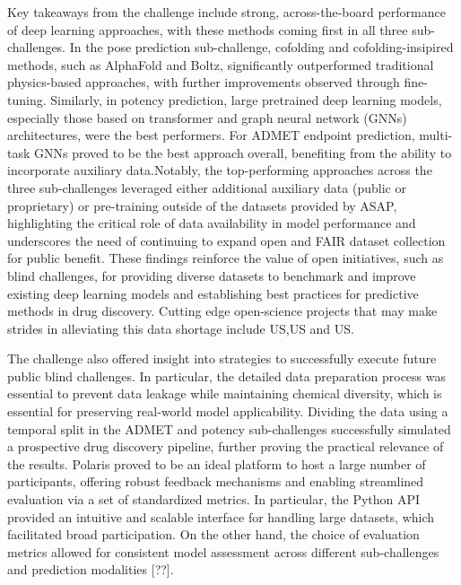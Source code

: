 \documentclass[journal=jcim,manuscript=article]{achemso}
\begin{document}
Key takeaways from the challenge include strong, across-the-board performance of deep learning approaches, with these methods coming first in all three sub-challenges. In the pose prediction sub-challenge, cofolding and cofolding-insipired methods, such as AlphaFold and Boltz, significantly outperformed traditional physics-based approaches, with further improvements observed through fine-tuning. Similarly, in potency prediction, large pretrained deep learning models, especially those based on transformer and graph neural network (GNNs) architectures, were the best performers. For ADMET endpoint prediction, multi-task GNNs proved to be the best approach overall, benefiting from the ability to incorporate auxiliary data.Notably, the top-performing approaches across the three sub-challenges leveraged either additional auxiliary data (public or proprietary) or pre-training outside of the datasets provided by ASAP, highlighting the critical role of data availability in model performance and underscores the need of continuing to expand open and FAIR dataset collection for public benefit. These findings reinforce the value of open initiatives, such as blind challenges, for providing diverse datasets to benchmark and improve existing deep learning models and establishing best practices for predictive methods in drug discovery. Cutting edge open-science projects that may make strides in alleviating this data shortage include US,US and US. 

The challenge also offered insight into strategies to successfully execute future public blind challenges. In particular, the detailed data preparation process was essential to prevent data leakage while maintaining chemical diversity, which is essential for preserving real-world model applicability. Dividing the data using a temporal split in the ADMET and potency sub-challenges successfully simulated a prospective drug discovery pipeline, further proving the practical relevance of the results.
Polaris proved to be an ideal platform to host a large number of participants, offering robust feedback mechanisms and enabling streamlined evaluation via a set of standardized metrics. In particular, the Python API provided an intuitive and scalable interface for handling large datasets, which facilitated broad participation. On the other hand, the choice of evaluation metrics allowed for consistent model assessment across different sub-challenges and prediction modalities [??].
\end{document}
